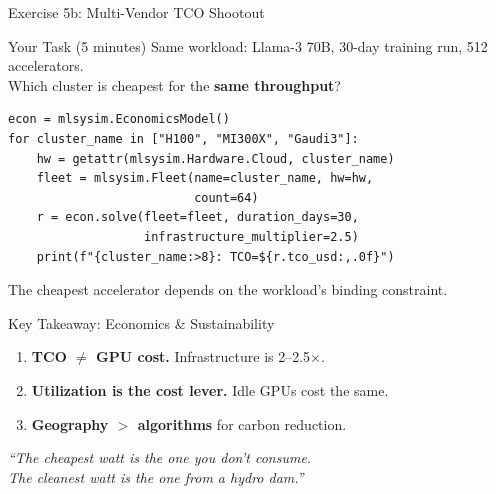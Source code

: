 \documentclass[aspectratio=169, 12pt]{beamer}
\begin{document}
\begin{frame}[fragile]{Exercise 5b: Multi-Vendor TCO Shootout}

\begin{alertblock}{Your Task (5 minutes)}
Same workload: Llama-3 70B, 30-day training run, 512 accelerators.\\
Which cluster is cheapest for the \textbf{same throughput}?
\end{alertblock}

\begin{lstlisting}
econ = mlsysim.EconomicsModel()
for cluster_name in ["H100", "MI300X", "Gaudi3"]:
    hw = getattr(mlsysim.Hardware.Cloud, cluster_name)
    fleet = mlsysim.Fleet(name=cluster_name, hw=hw,
                          count=64)
    r = econ.solve(fleet=fleet, duration_days=30,
                   infrastructure_multiplier=2.5)
    print(f"{cluster_name:>8}: TCO=${r.tco_usd:,.0f}")
\end{lstlisting}

\small
\alert{The cheapest accelerator depends on the workload's binding constraint.}
\end{frame}

\begin{frame}{Key Takeaway: Economics \& Sustainability}
\begin{center}
\Large
\begin{enumerate}
  \item \textbf{TCO $\neq$ GPU cost.} Infrastructure is 2--2.5$\times$.
  \item \textbf{Utilization is the cost lever.} Idle GPUs cost the same.
  \item \textbf{Geography $>$ algorithms} for carbon reduction.
\end{enumerate}

\vspace{1em}
\normalsize
\textit{``The cheapest watt is the one you don't consume.\\
The cleanest watt is the one from a hydro dam.''}
\end{center}
\end{frame}
\end{document}
